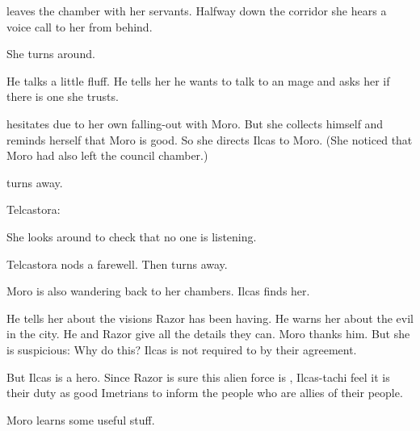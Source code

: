 \begin{garbage}
\begin{comment}
  \section{Ilcas talks to \Tiroco}
\end{comment}
\new
\Tiroco leaves the chamber with her servants. 
Halfway down the corridor she hears a voice call to her from behind. 

\ta{\Rinyuth[\Tiroco]!}

She turns around. 

He talks a little fluff. 
He tells her he wants to talk to an \Ishrah{} mage and asks her if there is one she trusts. 

\Tiroco{} hesitates due to her own falling-out with Moro. 
But she collects himself and reminds herself that Moro is good. 
So she directs Ilcas to Moro. 
(She noticed that Moro had also left the council chamber.)

\Tiroco turns away.

Telcastora:

She looks around to check that no one is listening.

Telcastora nods a farewell.
Then turns away. 





\begin{comment}
  \section{Ilcas talks to Moro}
\end{comment}
\new
Moro is also wandering back to her chambers.
Ilcas finds her. 


He tells her about the visions Razor has been having. 
He warns her about the evil in the city. 
He and Razor give all the details they can. 
Moro thanks him. 
But she is suspicious: Why do this? 
Ilcas is not required to by their agreement. 

But Ilcas is a hero. 
Since Razor is sure this alien force is , Ilcas-tachi feel it is their duty as good Imetrians to inform the people who are allies of their people. 

Moro learns some useful stuff. 
\end{garbage}





